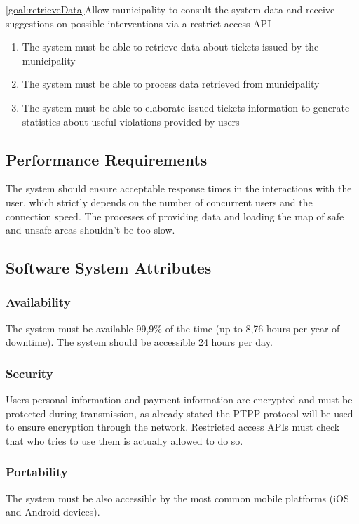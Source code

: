 \begin{description}
   			\item \ref{goal:retrieveData}Allow municipality to consult the system data and receive suggestions on possible interventions via a restrict access API 
   				\begin{enumerate}[resume*] 
  				\item The system must be able to retrieve data about tickets issued by the municipality 
   				\item The system must be able to process data retrieved from municipality
   				\item The system must be able to elaborate issued tickets information to generate statistics about useful violations provided by users
   			\end{enumerate}
   			
   	\end{description}
  	
\subsection{Performance Requirements}
	The system should ensure acceptable response times in the interactions with the user, which strictly depends on the number of concurrent users and the connection speed.
\newline
The processes of providing data and loading the map of safe and unsafe areas shouldn't be too slow.
\subsection{Software System Attributes}
	\subsubsection{Availability}
	The system must be available 99,9\% of the time (up to 8,76 hours per year of downtime). The system should be accessible 24 hours per day.
	\subsubsection{Security}
	Users personal information and payment information are encrypted and must be protected during transmission, as already stated the PTPP protocol will be used to ensure encryption through the network.
	Restricted access APIs must check that who tries to use them is actually allowed to do so.
	\subsubsection{Portability}
	The system must be also accessible by the most common mobile platforms (iOS and Android devices).

